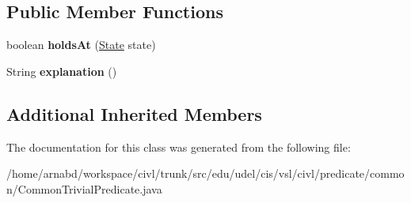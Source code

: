 \subsection*{Public Member Functions}
\begin{DoxyCompactItemize}
\item 
\hypertarget{classedu_1_1udel_1_1cis_1_1vsl_1_1civl_1_1predicate_1_1common_1_1CommonTrivialPredicate_a3472aa58c8f3fe77e0ee4802d80b6b94}{}boolean {\bfseries holds\+At} (\hyperlink{interfaceedu_1_1udel_1_1cis_1_1vsl_1_1civl_1_1state_1_1IF_1_1State}{State} state)\label{classedu_1_1udel_1_1cis_1_1vsl_1_1civl_1_1predicate_1_1common_1_1CommonTrivialPredicate_a3472aa58c8f3fe77e0ee4802d80b6b94}

\item 
\hypertarget{classedu_1_1udel_1_1cis_1_1vsl_1_1civl_1_1predicate_1_1common_1_1CommonTrivialPredicate_a7d634291066143721ef441bdfabf605e}{}String {\bfseries explanation} ()\label{classedu_1_1udel_1_1cis_1_1vsl_1_1civl_1_1predicate_1_1common_1_1CommonTrivialPredicate_a7d634291066143721ef441bdfabf605e}

\end{DoxyCompactItemize}
\subsection*{Additional Inherited Members}


The documentation for this class was generated from the following file\+:\begin{DoxyCompactItemize}
\item 
/home/arnabd/workspace/civl/trunk/src/edu/udel/cis/vsl/civl/predicate/common/Common\+Trivial\+Predicate.\+java\end{DoxyCompactItemize}
